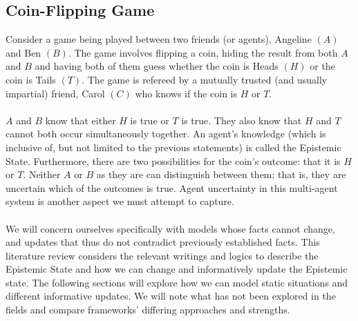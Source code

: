 \documentclass[12pt, a4paper, titlepage]{scrartcl}
\begin{document}
\subsection{Coin-Flipping Game}\label{intro_coinFlipping}
Consider a game being played between two friends (or agents), Angeline $(A)$
and Ben $(B)$.
The game involves flipping a coin, hiding the result from both $A$ and $B$ and
having both of them guess whether the coin is Heads $(H)$ or the coin is Tails
$(T)$.
The game is refereed by a mutually trusted (and usually impartial) friend, Carol
$(C)$ who knows if the coin is $H$ or $T$.\\
\\
$A$ and $B$ know that either $H$ is true or $T$ is true.
They also know that $H$ and $T$ cannot both occur simultaneously together.
An agent's knowledge (which is inclusive of, but not limited to the previous
statements) is called the Epistemic State.
Furthermore, there are two possibilities for the coin's outcome: that it is $H$
or $T$.
Neither $A$ or $B$ as they are can distinguish between them; that is, they are
uncertain which of the outcomes is true.
Agent uncertainty in this multi-agent system is another aspect we must attempt
to capture.\\
\\
We will concern ourselves specifically with models whose facts cannot change,
and updates that thus do not contradict previously established facts.
This literature review considers the relevant writings and logics to describe
the Epistemic State and how we can change and informatively update the Epistemic
state.
The following sections will explore how we can model static situations and
different informative updates.
We will note what has not been explored in the fields and compare frameworks'
differing approaches and strengths.
\end{document}
